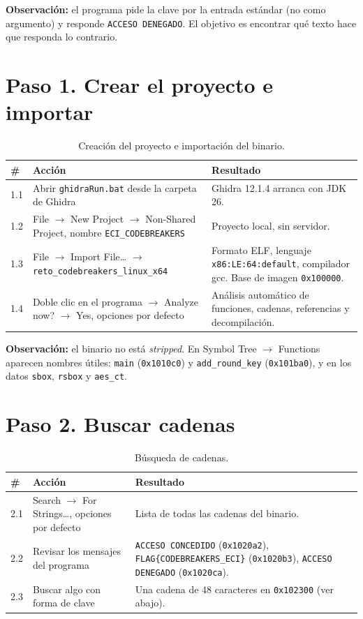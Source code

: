 \documentclass[journal]{IEEEtran}
\begin{document}
\noindent\textbf{Observaci\'on:} el programa pide la clave por la entrada est\'andar
(no como argumento) y responde \texttt{ACCESO DENEGADO}. El objetivo es encontrar
qu\'e texto hace que responda lo contrario.

\section{Paso 1. Crear el proyecto e importar}

\begin{table}[H]
\centering
\caption{Creaci\'on del proyecto e importaci\'on del binario.}
\footnotesize
\begin{tabular}{@{}l p{1.35in} p{1.45in}@{}}
\hline
\# & Acci\'on & Resultado \\ \hline
1.1 & Abrir \texttt{ghidraRun.bat} desde la carpeta de Ghidra & Ghidra 12.1.4 arranca con JDK 26. \\
1.2 & File $\rightarrow$ New Project $\rightarrow$ Non-Shared Project, nombre \texttt{ECI\_\allowbreak{}CODEBREAKERS} & Proyecto local, sin servidor. \\
1.3 & File $\rightarrow$ Import File\ldots{} $\rightarrow$ \texttt{reto\_\allowbreak{}codebreakers\_\allowbreak{}linux\_\allowbreak{}x64} & Formato ELF, lenguaje \texttt{x86:LE:64:default}, compilador gcc. Base de imagen \texttt{0x100000}. \\
1.4 & Doble clic en el programa $\rightarrow$ Analyze now? $\rightarrow$ Yes, opciones por defecto & An\'alisis autom\'atico de funciones, cadenas, referencias y decompilaci\'on. \\ \hline
\end{tabular}
\end{table}

\noindent\textbf{Observaci\'on:} el binario no est\'a \textit{stripped}. En
Symbol Tree $\rightarrow$ Functions aparecen nombres \'utiles: \texttt{main}
(\texttt{0x1010c0}) y \texttt{add\_\allowbreak{}round\_\allowbreak{}key} (\texttt{0x101ba0}), y en los datos
\texttt{sbox}, \texttt{rsbox} y \texttt{aes\_\allowbreak{}ct}.

\section{Paso 2. Buscar cadenas}

\begin{table}[H]
\centering
\caption{B\'usqueda de cadenas.}
\footnotesize
\begin{tabular}{@{}l p{1.1in} p{1.7in}@{}}
\hline
\# & Acci\'on & Resultado \\ \hline
2.1 & Search $\rightarrow$ For Strings\ldots{}, opciones por defecto & Lista de todas las cadenas del binario. \\
2.2 & Revisar los mensajes del programa & \texttt{ACCESO CONCEDIDO} (\texttt{0x1020a2}), \texttt{FLAG\{CODEBREAKERS\_\allowbreak{}ECI\}} (\texttt{0x1020b3}), \texttt{ACCESO DENEGADO} (\texttt{0x1020ca}). \\
2.3 & Buscar algo con forma de clave & Una cadena de 48 caracteres en \texttt{0x102300} (ver abajo). \\ \hline
\end{tabular}
\end{table}
\end{document}
